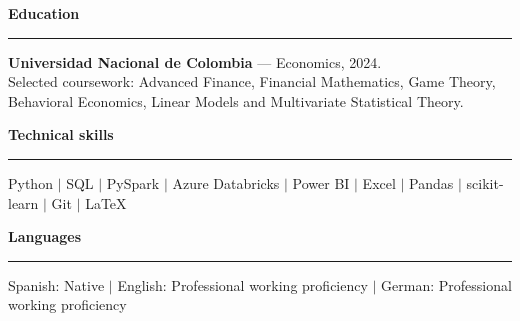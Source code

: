 \documentclass[10pt,a4paper]{article}
\newcommand{\sectiontitle}[1]{%
  \vspace{0.6em}\textbf{\large #1}\par\vspace{0.2em}\hrule\vspace{0.5em}
}
\begin{document}
\sectiontitle{Education}
\textbf{Universidad Nacional de Colombia} — Economics, 2024.\\
Selected coursework: Advanced Finance, Financial Mathematics, Game Theory,
Behavioral Economics, Linear Models and Multivariate Statistical Theory.

\sectiontitle{Technical skills}
Python $|$ SQL $|$ PySpark $|$ Azure Databricks $|$ Power BI $|$ Excel $|$
Pandas $|$ scikit-learn $|$ Git $|$ LaTeX

\sectiontitle{Languages}
Spanish: Native $|$ English: Professional working proficiency $|$
German: Professional working proficiency
\end{document}
